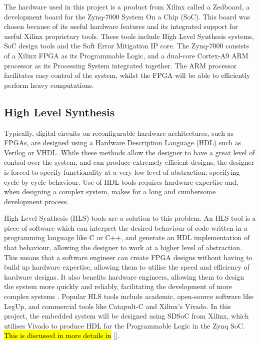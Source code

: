 \documentclass[12pt]{article}
\begin{document}
The hardware used in this project is a product from Xilinx called a Zedboard, a development board for the Zynq-7000 System On a Chip (SoC). This board was chosen because of its useful hardware features and its integrated support for useful Xilinx proprietary tools. These tools include High Level Synthesis systems, SoC design tools and the Soft Error Mitigation IP core. The Zynq-7000 consists of a Xilinx FPGA as its Programmable Logic, and a dual-core Cortex-A9 ARM processor as its Processing System integrated together. The ARM processor facilitates easy control of the system, whilst the FPGA will be able to efficiently perform heavy computations.


\subsection{High Level Synthesis}
\label{sec:Background-HLS}
\vspace{-12pt}

Typically, digital circuits on reconfigurable hardware architectures, such as FPGAs, are designed using a Hardware Description Language (HDL) such as Verilog or VHDL. While these methods allow the designer to have a great level of control over the system, and can produce extremely efficient designs, the designer is forced to specify functionality at a very low level of abstraction, specifying cycle by cycle behaviour. Use of HDL tools requires hardware expertise and, when designing a complex system, makes for a long and cumbersome development process.

High Level Synthesis (HLS) tools are a  solution to this problem. An HLS tool is a piece of software which can interpret the desired behaviour of code written in a programming language like C or C++, and generate an HDL implementation of that behaviour, allowing the designer to work at a higher level of abstraction. This means that a software engineer can create FPGA designs without having to build up hardware expertise, allowing them to utilise the speed and efficiency of hardware designs. It also benefits hardware engineers, allowing them to design the system more quickly and reliably, facilitating the development of more complex systems \cite{HLS}. Popular HLS tools include academic, open-source software like LegUp, and commercial tools like Catapult-C and Xilinx's Vivado. In this project, the embedded system will be designed using SDSoC from Xilinx, which utilises Vivado to produce HDL for the Programmable Logic in the Zynq SoC. \hl{This is discussed in more details in} \ref{}.
\end{document}
